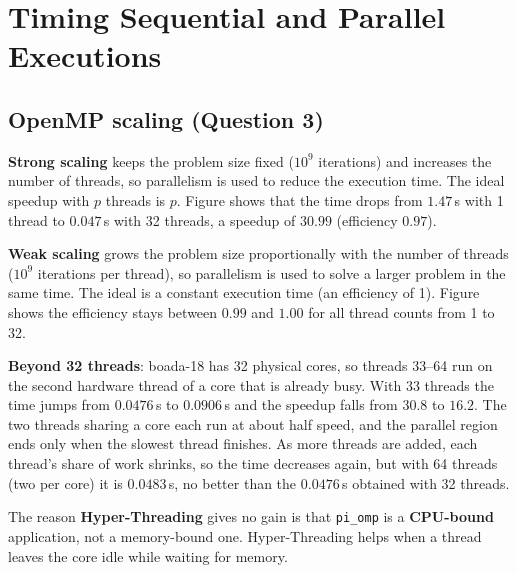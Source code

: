 \documentclass[11pt,a4paper]{article}
\begin{document}
\section{Timing Sequential and Parallel Executions}

\subsection{OpenMP scaling (Question 3)}

{\bfseries Strong scaling} keeps the problem size fixed ($10^9$ iterations) and increases the number of threads, so parallelism is used to reduce the execution time. The ideal speedup with $p$ threads is $p$. Figure shows that the time drops from $1.47$\,s with 1 thread to $0.047$\,s with 32 threads, a speedup of $30.99$ (efficiency $0.97$).

{\bfseries Weak scaling} grows the problem size proportionally with the number of threads ($10^9$ iterations per thread), so parallelism is used to solve a larger problem in the same time. The ideal is a constant execution time (an efficiency of 1). Figure shows the efficiency stays between $0.99$ and $1.00$ for all thread counts from 1 to 32.


{\bfseries Beyond 32 threads}: boada-18 has 32 physical cores, so threads 33--64 run on the second hardware thread of a core that is already busy. With 33 threads the time jumps from $0.0476$\,s to $0.0906$\,s and the speedup falls from $30.8$ to $16.2$. The two threads sharing a core each run at about half speed, and the parallel region ends only when the slowest thread finishes. As more threads are added, each thread's share of work shrinks, so the time decreases again, but with 64 threads (two per core) it is $0.0483$\,s, no better than the $0.0476$\,s obtained with 32 threads.

The reason \textbf{Hyper-Threading} gives no gain is that \texttt{pi\_omp} is a \textbf{CPU-bound} application, not a memory-bound one. Hyper-Threading helps when a thread leaves the core idle while waiting for memory.
\end{document}
